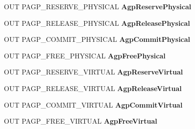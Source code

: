 \begin{DoxyCompactItemize}
O\+UT P\+A\+G\+P\+\_\+\+R\+E\+S\+E\+R\+V\+E\+\_\+\+P\+H\+Y\+S\+I\+C\+AL {\bfseries Agp\+Reserve\+Physical}
\item 
\mbox{\label{struct___v_i_d_e_o___p_o_r_t___a_g_p___i_n_t_e_r_f_a_c_e__2_ac134511542f6910ba9ae530b3cb0ea37}} 
O\+UT P\+A\+G\+P\+\_\+\+R\+E\+L\+E\+A\+S\+E\+\_\+\+P\+H\+Y\+S\+I\+C\+AL {\bfseries Agp\+Release\+Physical}
\item 
\mbox{\label{struct___v_i_d_e_o___p_o_r_t___a_g_p___i_n_t_e_r_f_a_c_e__2_a1210e1baf95cb6f22a42b9af48cdd96e}} 
O\+UT P\+A\+G\+P\+\_\+\+C\+O\+M\+M\+I\+T\+\_\+\+P\+H\+Y\+S\+I\+C\+AL {\bfseries Agp\+Commit\+Physical}
\item 
\mbox{\label{struct___v_i_d_e_o___p_o_r_t___a_g_p___i_n_t_e_r_f_a_c_e__2_ab36c5ac069ccaff98623c5f564b1c389}} 
O\+UT P\+A\+G\+P\+\_\+\+F\+R\+E\+E\+\_\+\+P\+H\+Y\+S\+I\+C\+AL {\bfseries Agp\+Free\+Physical}
\item 
\mbox{\label{struct___v_i_d_e_o___p_o_r_t___a_g_p___i_n_t_e_r_f_a_c_e__2_a3242877a07be0327b1e436794bf8f6d9}} 
O\+UT P\+A\+G\+P\+\_\+\+R\+E\+S\+E\+R\+V\+E\+\_\+\+V\+I\+R\+T\+U\+AL {\bfseries Agp\+Reserve\+Virtual}
\item 
\mbox{\label{struct___v_i_d_e_o___p_o_r_t___a_g_p___i_n_t_e_r_f_a_c_e__2_aa45100daf5bdbd31a1145b2dd4d412ac}} 
O\+UT P\+A\+G\+P\+\_\+\+R\+E\+L\+E\+A\+S\+E\+\_\+\+V\+I\+R\+T\+U\+AL {\bfseries Agp\+Release\+Virtual}
\item 
\mbox{\label{struct___v_i_d_e_o___p_o_r_t___a_g_p___i_n_t_e_r_f_a_c_e__2_a02f4043d1c020eedba8bb8e658c812be}} 
O\+UT P\+A\+G\+P\+\_\+\+C\+O\+M\+M\+I\+T\+\_\+\+V\+I\+R\+T\+U\+AL {\bfseries Agp\+Commit\+Virtual}
\item 
\mbox{\label{struct___v_i_d_e_o___p_o_r_t___a_g_p___i_n_t_e_r_f_a_c_e__2_a7f491008c28b978daed6d642157f08a3}} 
O\+UT P\+A\+G\+P\+\_\+\+F\+R\+E\+E\+\_\+\+V\+I\+R\+T\+U\+AL {\bfseries Agp\+Free\+Virtual}

\end{DoxyCompactItemize}
